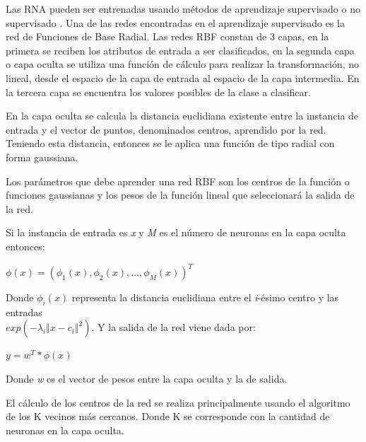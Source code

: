 Las RNA pueden ser entrenadas usando métodos de aprendizaje supervisado o no supervisado \cite{key-240}. Una de las redes encontradas en el aprendizaje supervisado es la red de Funciones de Base Radial. Las redes RBF constan de 3 capas, en la primera se reciben los atributos de entrada a ser clasificados, en la segunda capa o capa oculta se utiliza una función de cálculo para realizar la transformación, no lineal, desde el espacio de la capa de entrada al espacio de la capa intermedia. En la tercera capa se encuentra los valores posibles de la clase a clasificar. 

En la capa oculta se calcula la distancia euclidiana existente entre la instancia de entrada y el vector de puntos, denominados centros, aprendido por la red. Teniendo esta distancia, entonces se le aplica una función de tipo radial con forma gaussiana.

Los parámetros que debe aprender una red RBF son los centros de la función o funciones gaussianas y los pesos de la función lineal que seleccionará la salida de la red.

Si la instancia de entrada es \emph{x} y \emph{M} es el número de neuronas en la capa oculta entonces:
\begin{center}
$\phi(x)=(\phi_{1}(x),\phi_{2}(x),...,\phi_{M}(x))^{T}$
\end{center}
Donde $\phi_{i}(x)$ representa la distancia euclidiana entre el \emph{i}-ésimo centro y las entradas\\
$exp(-\lambda_{i}\Vert x-c_{i}\Vert^{2})$. Y la salida de la red viene dada por:
\begin{center}
$y=w^{T}*\phi(x)$
\end{center}
Donde \emph{w} es el vector de pesos entre la capa oculta y la de salida.

El cálculo de los centros de la red se realiza principalmente usando el algoritmo de los K vecinos más cercanos. Donde K se corresponde con la cantidad de neuronas en la capa oculta.

